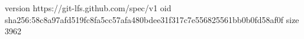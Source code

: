 version https://git-lfs.github.com/spec/v1
oid sha256:58c8a97afd519fc8fa5cc57afa480bdee31f317c7e556825561bb0b0fd58af0f
size 3962
